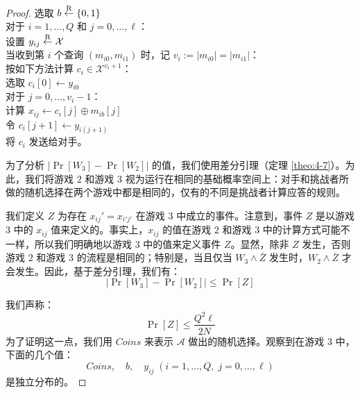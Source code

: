 \begin{proof}
\hspace*{5pt} 选取 $b\overset{\rm R}\leftarrow\{0,1\}$\\
\hspace*{26pt} 对于 $i=1,\dots,Q$ 和 $j=0,\dots,\ell$：\\
\hspace*{50pt} 设置 $y_{ij}\overset{\rm R}\leftarrow\mathcal{X}$\\
\hspace*{26pt} 当收到第 $i$ 个查询 $(m_{i0},m_{i1})$ 时，记 $v_i:=|m_{i0}|=|m_{i1}|$：\\
\hspace*{50pt} 按如下方法计算 $c_i\in\mathcal{X}^{v_i+1}$：\\
\hspace*{75pt} 选取 $c_i[0]\leftarrow y_{i0}$\\
\hspace*{75pt} 对于 $j=0,\dots,v_i-1$：\\
\hspace*{100pt} 计算 $x_{ij}\leftarrow c_i[j]\oplus m_{ib}[j]$\\
\hspace*{100pt} 令 $c_i[j+1]\leftarrow y_{i(j+1)}$\\
\hspace*{50pt} 将 $c_i$ 发送给对手。

\vspace{5pt}

为了分析 $|\Pr[W_3]-\Pr[W_2]|$ 的值，我们使用差分引理（定理 \ref{theo:4-7}）。为此，我们将游戏 $2$ 和游戏 $3$ 视为运行在相同的基础概率空间上：对手和挑战者所做的随机选择在两个游戏中都是相同的，仅有的不同是挑战者计算应答的规则。

我们定义 $Z$ 为存在 $x_{ij}'=x_{i'j'}$ 在游戏 $3$ 中成立的事件。注意到，事件 $Z$ 是以游戏 $3$ 中的 $x_{ij}$ 值来定义的。事实上，$x_{ij}$ 的值在游戏 $2$ 和游戏 $3$ 中的计算方式可能不一样，所以我们明确地以游戏 $3$ 中的值来定义事件 $Z$。显然，除非 $Z$ 发生，否则游戏 $2$ 和游戏 $3$ 的流程是相同的；特别是，当且仅当 $W_3\land\bar{Z}$ 发生时，$W_2\land\bar{Z}$ 才会发生。因此，基于差分引理，我们有：
\begin{equation}\label{eq:5-27}
|\Pr[W_3]-\Pr[W_2]|\leq\Pr[Z]
\end{equation}

我们声称：
\begin{equation}\label{eq:5-28}
\Pr[Z]\leq\frac{Q^2\ell}{2N}
\end{equation}
为了证明这一点，我们用 $Coins$ 来表示 $\mathcal{A}$ 做出的随机选择。观察到在游戏 $3$ 中，下面的几个值：
\[
Coins,\quad
b,\quad
y_{ij}\;(i=1,\dots,Q,\;j=0,\dots,\ell)
\]
是独立分布的。


\end{proof}
